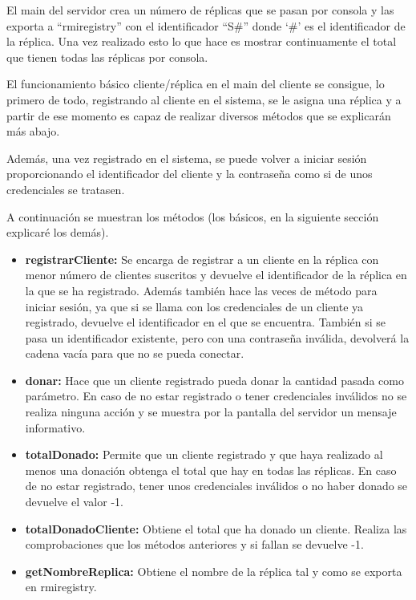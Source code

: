\documentclass{article}
\begin{document}



El main del servidor crea un número de réplicas que se pasan por consola y las exporta a ``rmiregistry'' con el identificador ``S\#'' donde `\#' es el identificador de la réplica. Una vez realizado esto lo que hace es mostrar continuamente el total que tienen todas las réplicas por consola.

El funcionamiento básico cliente/réplica en el main del cliente se consigue, lo primero de todo, registrando al cliente en el sistema, se le asigna una réplica y a partir de ese momento es capaz de realizar diversos métodos que se explicarán más abajo.

Además, una vez registrado en el sistema, se puede volver a iniciar sesión proporcionando el identificador del cliente y la contraseña como si de unos credenciales se tratasen.

A continuación se muestran los métodos (los básicos, en la siguiente sección explicaré los demás).

\begin{itemize}
    \item \textbf{registrarCliente: }Se encarga de registrar a un cliente en la réplica con menor número de clientes suscritos y devuelve el identificador de la réplica en la que se ha registrado. Además también hace las veces de método para iniciar sesión, ya que si se llama con los credenciales de un cliente ya registrado, devuelve el identificador en el que se encuentra. También si se pasa un identificador existente, pero con una contraseña inválida, devolverá la cadena vacía para que no se pueda conectar.
    
    \item \textbf{donar: }Hace que un cliente registrado pueda donar la cantidad pasada como parámetro. En caso de no estar registrado o tener credenciales inválidos no se realiza ninguna acción y se muestra por la pantalla del servidor un mensaje informativo.

    \item \textbf{totalDonado: }Permite que un cliente registrado y que haya realizado al menos una donación obtenga el total que hay en todas las réplicas. En caso de no estar registrado, tener unos credenciales inválidos o no haber donado se devuelve el valor -1.
    
    \item \textbf{totalDonadoCliente: }Obtiene el total que ha donado un cliente. Realiza las comprobaciones que los métodos anteriores y si fallan se devuelve -1.\
    
    \item \textbf{getNombreReplica: }Obtiene el nombre de la réplica tal y como se exporta en rmiregistry.
\end{itemize}
\end{document}
